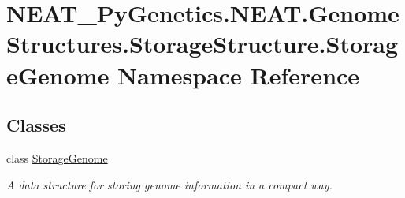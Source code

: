 \hypertarget{namespaceNEAT__PyGenetics_1_1NEAT_1_1GenomeStructures_1_1StorageStructure_1_1StorageGenome}{}\section{N\+E\+A\+T\+\_\+\+Py\+Genetics.\+N\+E\+A\+T.\+Genome\+Structures.\+Storage\+Structure.\+Storage\+Genome Namespace Reference}
\label{namespaceNEAT__PyGenetics_1_1NEAT_1_1GenomeStructures_1_1StorageStructure_1_1StorageGenome}
\subsection*{Classes}
\begin{DoxyCompactItemize}
\item 
class \hyperlink{classNEAT__PyGenetics_1_1NEAT_1_1GenomeStructures_1_1StorageStructure_1_1StorageGenome_1_1StorageGenome}{Storage\+Genome}
\begin{DoxyCompactList}\small\item\em A data structure for storing genome information in a compact way. \end{DoxyCompactList}\end{DoxyCompactItemize}
